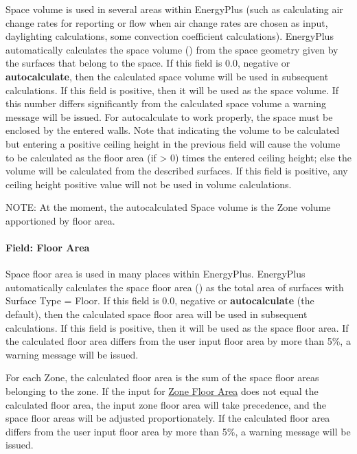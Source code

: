 Space volume is used in several areas within EnergyPlus (such as calculating air change rates for reporting or flow when air change rates are chosen as input, daylighting calculations, some convection coefficient calculations). EnergyPlus automatically calculates the space volume (\SI{}{\volume}) from the space geometry given by the surfaces that belong to the space. If this field is 0.0, negative or \textbf{autocalculate}, then the calculated space volume will be used in subsequent calculations. If this field is positive, then it will be used as the space volume. If this number differs significantly from the calculated space volume a warning message will be issued. For autocalculate to work properly, the space must be enclosed by the entered walls. Note that indicating the volume to be calculated but entering a positive ceiling height in the previous field will cause the volume to be calculated as the floor area (if \textgreater{} 0) times the entered ceiling height; else the volume will be calculated from the described surfaces. If this field is positive, any ceiling height positive value will not be used in volume calculations.

NOTE: At the moment, the autocalculated Space volume is the Zone volume apportioned by floor area.

\paragraph{Field: Floor Area}\label{space-field-floor-area}

Space floor area is used in many places within EnergyPlus. EnergyPlus automatically calculates the space floor area (\SI{}{\area}) as the total area of surfaces with Surface Type = Floor. If this field is 0.0, negative or \textbf{autocalculate} (the default), then the calculated space floor area will be used in subsequent calculations. If this field is positive, then it will be used as the space floor area. If the calculated floor area differs from the user input floor area by more than 5\%, a warning message will be issued.

For each Zone, the calculated floor area is the sum of the space floor areas belonging to the zone. If the input for \hyperref[field-floor-area]{Zone Floor Area} does not equal the calculated floor area, the input zone floor area will take precedence, and the space floor areas will be adjusted proportionately.  If the calculated floor area differs from the user input floor area by more than 5\%, a warning message will be issued.

